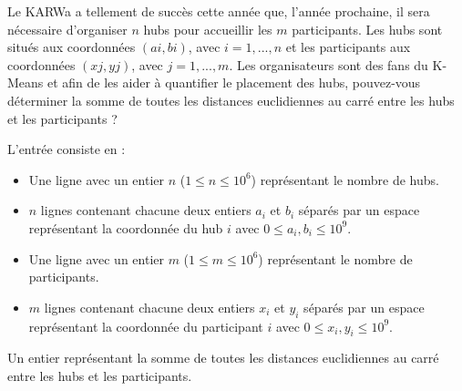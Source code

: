 \problemname{\problemyamlname}


\newcommand{\maxa}{123456789}

Le KARWa a tellement de succès cette année que, l'année prochaine, il sera nécessaire d'organiser $n$ hubs pour
accueillir les $m$ participants. Les hubs sont situés aux coordonnées $(ai , bi )$, avec $i = 1, ..., n$ et les participants aux coordonnées $(xj , yj )$, avec $j = 1, ..., m$.
Les organisateurs sont des fans du K-Means et afin de les aider à quantifier le placement des hubs, pouvez-vous
déterminer la somme de toutes les distances euclidiennes au carré entre les hubs et les participants ?
\begin{Input}
    L'entrée consiste en :
    \begin{itemize}
        \item Une ligne avec un entier \(n\) (\(1 \leq n \leq 10^{6}\)) représentant le nombre de hubs.
      \item \(n\) lignes contenant chacune deux entiers \(a_{i}\) et \(b_{i}\) séparés par un espace représentant la coordonnée du hub \(i\) avec \(0 \leq a_i, b_i\leq 10^{9}\).
        \item Une ligne avec un entier \(m\) (\(1 \leq m \leq 10^{6}\))  représentant le nombre de participants.
      \item \(m\) lignes contenant chacune deux entiers \(x_{i}\) et \(y_{i}\) séparés par un espace représentant la coordonnée du participant \(i\) avec \(0 \leq x_i, y_i\leq 10^{9}\).
    \end{itemize}
\end{Input}

\begin{Output}
Un entier représentant la somme de toutes les distances euclidiennes au carré entre les hubs et les participants.
\end{Output}
